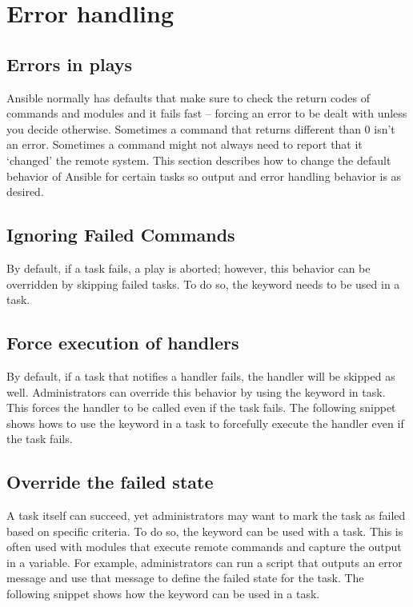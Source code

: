 \section{Error handling}
\subsection{Errors in plays}

Ansible normally has defaults that make sure to check the return codes of commands and modules and it fails fast – forcing an error to be dealt with unless you decide otherwise. Sometimes a command that returns different than 0 isn’t an error. Sometimes a command might not always need to report that it ‘changed’ the remote system. This section describes how to change the default behavior of Ansible for certain tasks so output and error handling behavior is as desired.

\subsection{Ignoring Failed Commands}
By default, if a task fails, a play is aborted; however, this behavior can be overridden by skipping failed tasks. To do so, the  keyword needs to be used in a task.


\subsection{Force execution of handlers}

By default, if a task that notifies a handler fails, the handler will be skipped as well. Administrators can override this behavior by using the  keyword in task. This forces the handler to be called even if the task fails. The following snippet shows hows to use the  keyword in a task to forcefully execute the handler even if the task fails.


\subsection{Override the failed state}

A task itself can succeed, yet administrators may want to mark the task as failed based on specific criteria. To do so, the  keyword can be used with a task. This is often used with modules that execute remote commands and capture the output in a variable. For example, administrators can run a script that outputs an error message and use that message to define the failed state for the task. The following snippet shows how the  keyword can be used in a task.

